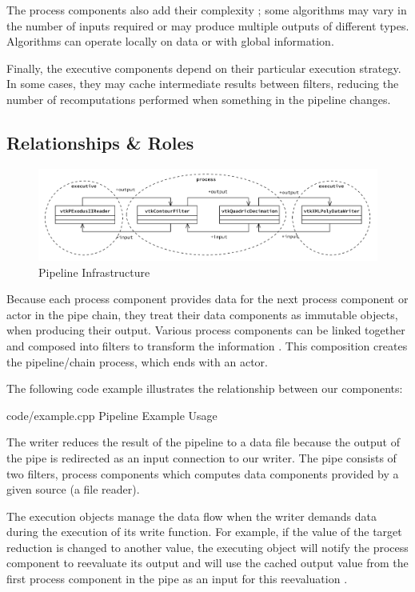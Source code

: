 The process components also add their complexity \cite{git}; some algorithms may vary in the number of inputs required or may produce multiple outputs of different types. Algorithms can operate locally on data or with global information. 

Finally, the executive components depend on their particular execution strategy. In some cases, they may cache intermediate results between filters, reducing the number of recomputations performed when something in the pipeline changes. 

\subsection{Relationships \& Roles}


\begin{figure}[h!]
    \centering
    \includegraphics[width=15cm]{diagrams/process.png}
    \caption{Pipeline Infrastructure}
    \label{fig::pipe}
\end{figure}

Because each process component provides data for the next process component or actor in the pipe chain,  they treat their data components as immutable objects, when producing their output. Various process components can be linked together and composed into filters to transform the information \cite{aosabook}. This composition creates the pipeline/chain process, which ends with an actor.

The following code example illustrates the relationship between our components:

    {code/example.cpp}
    {Pipeline Example Usage}
\label{fig::pipeline::example::code}

The writer reduces the result of the pipeline to a data file because the output of the pipe is redirected as an input connection to our writer.  The pipe consists of two filters, process components which computes data components provided by a given source (a file reader).

The execution objects manage the data flow when the writer demands data during the execution of its write function. For example, if the value of the target reduction is changed to another value, the executing object will notify the process component to reevaluate its output and will use the cached output value from the first process component in the pipe as an input for this reevaluation \cite{aosabook}.

